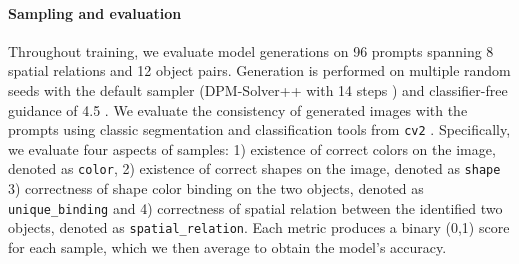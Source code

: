 \documentclass[10pt,twocolumn,letterpaper]{article}
\begin{document}
\paragraph{Sampling and evaluation}
Throughout training, we evaluate model generations on 96 prompts spanning 8 spatial relations and 12 object pairs. Generation is performed on multiple random seeds with the default sampler (DPM-Solver++ with 14 steps \citep{lu2022dpm++}) and classifier-free guidance of 4.5 \citep{ho2022classifierFreeGuidance}. We evaluate the consistency of generated images with the prompts using classic segmentation and classification tools from \texttt{cv2} \cite{bradski2000opencv}. 
Specifically, we evaluate four aspects of samples: 1) existence of correct colors on the image, denoted as \texttt{color}, 2) existence of correct shapes on the image, denoted as \texttt{shape} 3) correctness of shape color binding on the two objects, denoted as \texttt{unique\_binding} and 4) correctness of spatial relation between the identified two objects, denoted as \texttt{spatial\_relation}. 
Each metric produces a binary (0,1) score for each sample, which we then average to obtain the model’s accuracy.
\end{document}
